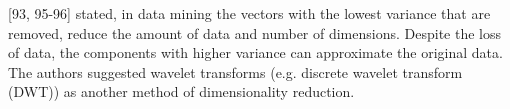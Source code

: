 \textcite{han2011data}[93, 95-96] stated, in data mining the vectors with the lowest variance that are removed, reduce the amount of data and number of dimensions. Despite the loss of data, the components with higher variance can approximate the original data. The authors suggested wavelet transforms (e.g. discrete wavelet transform (DWT)) as another method of dimensionality reduction.









